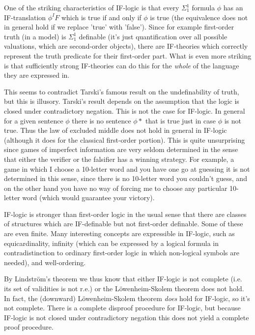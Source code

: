 \documentclass[12pt]{article}
\begin{document}
One of the striking characteristics of IF-logic is that every $\Sigma^1_1$ formula $\phi$ has an IF-translation $\phi^IF$ which is true if and only if $\phi$ is true (the equivalence does not in general hold if we replace 'true' with 'false'). Since for example first-order truth (in a model) is $\Sigma^1_1$ definable (it's just quantification over all possible valuations, which are second-order objects), there are IF-theories which correctly represent the truth predicate for their first-order part. What is even more striking is that sufficiently strong IF-theories can do this for the {\em whole} of the language they are expressed in.

This seems to contradict Tarski's famous result on the undefinability of truth, but this is illusory. Tarski's result depends on the assumption that the logic is closed under contradictory negation. This is not the case for IF-logic. In general for a given sentence $\phi$ there is no sentence $\phi*$ that is true just in case $\phi$ is not true. Thus the law of excluded middle does not hold in general in IF-logic (although it does for the classical first-order portion). This is quite unsurprising since games of imperfect information are very seldom determined in the sense that either the verifier or the falsifier has a winning strategy. For example, a game in which I choose a 10-letter word and you have one go at guessing it is not determined in this sense, since there is no 10-letter word you couldn't guess, and on the other hand you have no way of forcing me to choose any particular 10-letter word (which would guarantee your victory).

IF-logic is stronger than first-order logic in the usual sense that there are classes of structures which are IF-definable but not first-order definable. Some of these are even finite. Many interesting concepts are expressible in IF-logic, such as equicardinality, infinity (which can be expressed by a logical formula in contradistinction to ordinary first-order logic in which non-logical symbols are needed), and well-ordering.

By Lindstr\"om's theorem we thus know that either IF-logic is not complete (i.e. its set of validities is not r.e.) or the L\"owenheim-Skolem theorem does not hold. In fact, the (downward) L\"owenheim-Skolem theorem {\em does} hold for IF-logic, so it's not complete. There is a complete disproof procedure for IF-logic, but because IF-logic is not closed under contradictory negation this does not yield a complete proof procedure.
\end{document}
